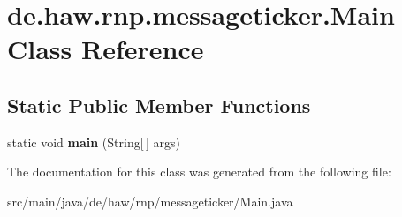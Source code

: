 \hypertarget{classde_1_1haw_1_1rnp_1_1messageticker_1_1Main}{\section{de.\-haw.\-rnp.\-messageticker.\-Main Class Reference}
\label{classde_1_1haw_1_1rnp_1_1messageticker_1_1Main}
}
\subsection*{Static Public Member Functions}
\begin{DoxyCompactItemize}
\item 
\hypertarget{classde_1_1haw_1_1rnp_1_1messageticker_1_1Main_a26be98cd60a111da6895a2f842f48812}{static void {\bfseries main} (String\mbox{[}$\,$\mbox{]} args)}\label{classde_1_1haw_1_1rnp_1_1messageticker_1_1Main_a26be98cd60a111da6895a2f842f48812}

\end{DoxyCompactItemize}


The documentation for this class was generated from the following file\-:\begin{DoxyCompactItemize}
\item 
src/main/java/de/haw/rnp/messageticker/Main.\-java\end{DoxyCompactItemize}
